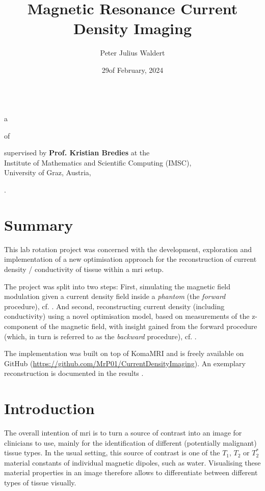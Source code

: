 \documentclass[10pt]{article}
\title{Magnetic Resonance Current Density Imaging}
\author{Peter Julius Waldert}
\date{29\th of February, 2024}
\begin{document}
  \makeatletter
  \begin{center}
    {\Huge \@title} \\
    a\hspace{.4em}{\large BioTechMed-Graz Lab Rotation Report}
    \vspace{.5cm}

    of\hspace{.5em}{\large \@author}
    \vspace{.3cm}

    supervised by \textbf{Prof. Kristian Bredies} at the \\
    Institute of Mathematics and Scientific Computing (IMSC), \\
    University of Graz, Austria,
    \vspace{.3cm}

    {\@date}.
  \end{center}
  \makeatother

  \section{Summary}
  This lab rotation project was concerned with the development, exploration and implementation of a new optimisation approach for the reconstruction of current density / conductivity of tissue within a \gls{mri} setup.

  The project was split into two steps: First, simulating the magnetic field modulation given a current density field inside a \textit{phantom} (the \textit{forward} procedure), cf. .
  And second, reconstructing current density (including conductivity) using a novel optimisation model, based on measurements of the z-component of the magnetic field, with insight gained from the forward procedure (which, in turn is referred to as the \textit{backward} procedure), cf. .

  The implementation was built on top of KomaMRI \parencite{2022-koma-mri} and is freely available on GitHub (\url{https://github.com/MrP01/CurrentDensityImaging}).
  An exemplary reconstruction is documented in the results .

  \section{Introduction}
  The overall intention of \gls{mri} is to turn a source of contrast into an image for clinicians to use, mainly for the identification of different (potentially malignant) tissue types.
  In the usual setting, this source of contrast is one of the $T_1$, $T_2$ or $T_2^*$ material constants of individual magnetic dipoles, such as water.
  Visualising these material properties in an image therefore allows to differentiate between different types of tissue visually.
\end{document}
